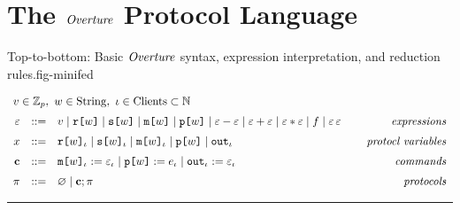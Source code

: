 \section{The $\mathit{Overture}$ Protocol Language}

\begin{fpfig}[t]{Top-to-bottom: Basic $\mathit{Overture}$ syntax, expression interpretation, and reduction rules.}{fig-minifed}
  {
    $$
    \begin{array}{rcl@{\hspace{8mm}}r}
      \multicolumn{4}{l}{v \in \mathbb{Z}_p,\ w \in \mathrm{String},\ \cid \in \mathrm{Clients} \subset  \mathbb{N} }\\[2mm] %
      \be &::=& v \mid \flip{w} \mid \secret{w} \mid \mesg{w} \mid \rvl{w} \mid \be \fminus \be \mid \be \fplus \be \mid \be \ftimes \be \mid f \mid \be\,\be & \textit{expressions}\\[2mm]
      x &::=& \elab{\flip{w}}{\cid} \mid \elab{\secret{w}}{\cid} \mid \elab{\mesg{w}}{\cid} \mid \rvl{w} \mid \out{\cid} & \textit{protocl variables} \\[2mm]
      \instr &::=& \eassign{\mesg{w}}{\cid}{\be}{\cid} \mid
      \reveal{w}{e}{\cid} \mid \pubout{\cid}{\be}{\cid} & \textit{commands} \\[2mm]
      \prog &::=& \varnothing \mid \instr; \prog & \textit{protocols}
    \end{array}
    $$
  
  \rule{130mm}{0.5pt}

}
\end{fpfig}
